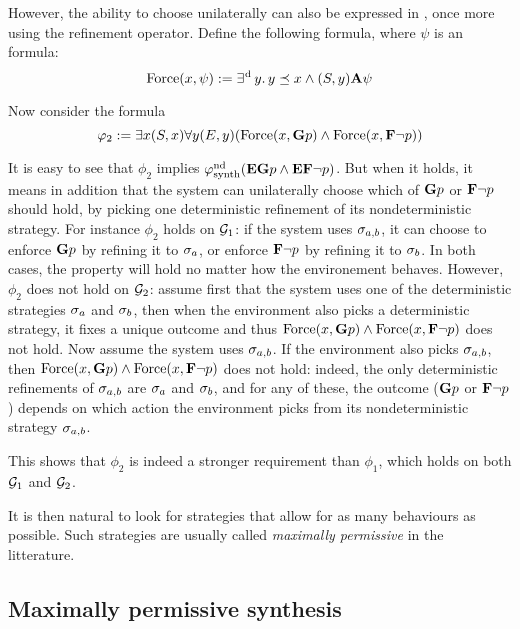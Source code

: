   
However, the ability to choose unilaterally can also be expressed in
\SLref, once more using the refinement operator.
Define the following formula, where $\psi$ is an \LTL formula:
\[\text{Force}(x,\psi):=\operatorname*{\exists^{\hskip.5pt\text{d}}} y.\, y\preceq x
  \wedge (S,y){\bf A}\psi\]

Now consider the formula
\[\varphi_2:=\exists x (S,x) \forall y (E,y) (\text{Force}(x, {\bf G} p)
  \wedge \text{Force}(x,{\bf F} \neg p))\]

It is easy to see that $\phi_2$ implies $\varphi^{\text{nd}}_{\text{synth}}({\bf E}{\bf G} p
\wedge {\bf E}{\bf F}\neg p)$. But when it holds, it means in addition that the
system can unilaterally choose which of ${\bf G} p$ or ${\bf F}\neg p$
should hold, by picking one deterministic refinement of its
nondeterministic strategy. For instance $\phi_2$  holds on $\CGS_1$:
if the system uses $\sigma_{a,b}$, it can choose to enforce
${\bf G} p$ by refining it to $\sigma_a$, or
enforce ${\bf F}\neg p$ by  refining it to $\sigma_b$.
In both cases, the property will hold no matter how the environement
behaves.
However, $\phi_2$ does not hold on $\CGS_2$: assume first that the system uses one of
the deterministic strategies $\sigma_a$ and $\sigma_b$, then when the
environment also picks a deterministic strategy, it fixes a unique
outcome and thus $\text{Force}(x, {\bf G} p)
  \wedge \text{Force}(x,{\bf F} \neg p)$ does not hold. Now assume  the system
  uses $\sigma_{a,b}$. If the environment also picks $\sigma_{a,b}$,
  then $\text{Force}(x, {\bf G} p)
  \wedge \text{Force}(x,{\bf F} \neg p)$ does not hold: indeed, the only
  deterministic refinements of $\sigma_{a,b}$ are $\sigma_a$ and
  $\sigma_b$, and for any of these, the outcome (${\bf G} p$ or
  ${\bf F}\neg p$) depends on which action the environment picks from its
  nondeterministic strategy $\sigma_{a,b}$.

This shows that $\phi_2$ is indeed a stronger requirement than
$\phi_1$, which holds on both $\CGS_1$ and $\CGS_2$.
  

  
It is then natural to look for  strategies that allow for as many
behaviours as possible. Such strategies are usually called
\emph{maximally permissive} in the litterature.



\subsection{Maximally permissive synthesis}
\label{sec-max-perm}

